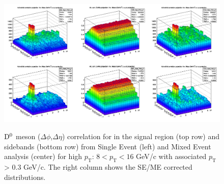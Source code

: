 \begin{figure}
\centering
{\includegraphics[width=1\linewidth]{figures/Dzero/CorrSEandME_Dzero_Canvas_PtIntBins9to11_pool7_thr0dot3to99dot0.png}}

 \caption{${\rm D^0}$ meson ($\Delta\phi$,$ \Delta\eta$) correlation for in the signal region (top row) and sidebands (bottom row) from  Single Event (left) and Mixed Event analysis (center) for high $p_\mathrm{T}$: $8 < p_\mathrm{T}<16$ GeV/c with associated $p_\mathrm{T}$ > 0.3 GeV/c. The right column shows the SE/ME corrected distributions.}
\label{fig:DzeroME}
\end{figure}

